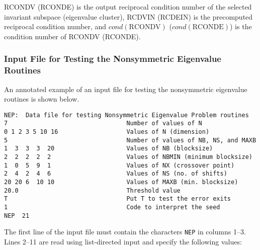 RCONDV (RCONDE) is the output reciprocal condition number of
the selected invariant subspace (eigenvalue cluster),
RCDVIN (RCDEIN) is the precomputed
reciprocal condition number, and $cond(\mbox{RCONDV})$ ($cond(\mbox{RCONDE})$) is the
condition number of RCONDV (RCONDE).

\subsubsection{Input File for Testing the Nonsymmetric Eigenvalue Routines}

\dent
An annotated example of an input file for testing the nonsymmetric
eigenvalue routines is shown below.

\begin{verbatim}
NEP:  Data file for testing Nonsymmetric Eigenvalue Problem routines
7                                 Number of values of N
0 1 2 3 5 10 16                   Values of N (dimension)
5                                 Number of values of NB, NS, and MAXB
1  3  3  3  20                    Values of NB (blocksize)
2  2  2  2  2                     Values of NBMIN (minimum blocksize)
1  0  5  9  1                     Values of NX (crossover point)
2  4  2  4  6                     Values of NS (no. of shifts)
20 20 6  10 10                    Values of MAXB (min. blocksize)
20.0                              Threshold value
T                                 Put T to test the error exits
1                                 Code to interpret the seed
NEP  21
\end{verbatim}

The first line of the input file
must contain the characters {\tt NEP} in columns 1--3.
Lines 2--11 are read using list-directed input and specify the following
values:

